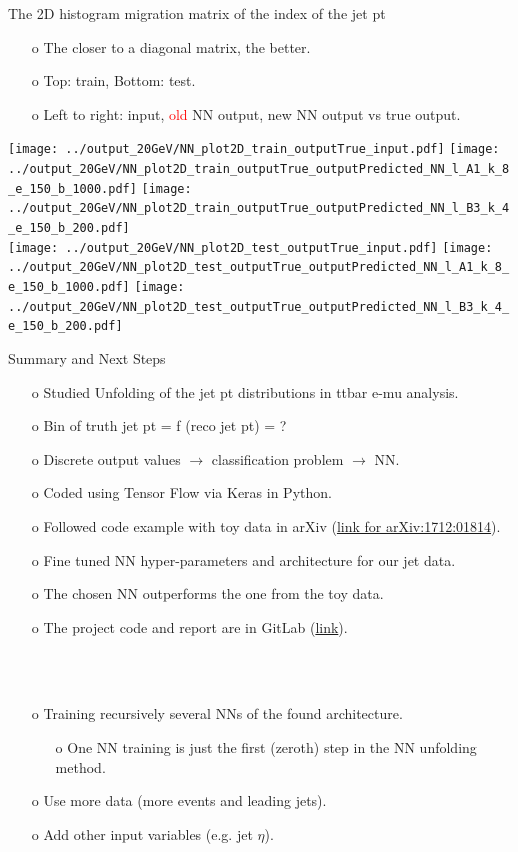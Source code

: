 \begin{frame}{The 2D histogram migration matrix of the index of the jet pt}
\begin{enumerate}
\item[o] The closer to a diagonal matrix, the better.
\item[o] Top: train, Bottom: test.
\item[o] Left to right: input, \textcolor{red}{old} NN output, \textcolor{OliveGreen}{new} NN output vs true output. 
\end{enumerate}
\centering
\texttt{[image: ../output\_20GeV/NN\_plot2D\_train\_outputTrue\_input.pdf]}
\texttt{[image: ../output\_20GeV/NN\_plot2D\_train\_outputTrue\_outputPredicted\_NN\_l\_A1\_k\_8\_e\_150\_b\_1000.pdf]}
\texttt{[image: ../output\_20GeV/NN\_plot2D\_train\_outputTrue\_outputPredicted\_NN\_l\_B3\_k\_4\_e\_150\_b\_200.pdf]}\\
\texttt{[image: ../output\_20GeV/NN\_plot2D\_test\_outputTrue\_input.pdf]}
\texttt{[image: ../output\_20GeV/NN\_plot2D\_test\_outputTrue\_outputPredicted\_NN\_l\_A1\_k\_8\_e\_150\_b\_1000.pdf]}
\texttt{[image: ../output\_20GeV/NN\_plot2D\_test\_outputTrue\_outputPredicted\_NN\_l\_B3\_k\_4\_e\_150\_b\_200.pdf]}\\
\end{frame}
\clearpage

\begin{frame}{Summary and Next Steps}
\begin{enumerate}
\item[o] Studied Unfolding of the jet pt distributions in ttbar e-mu analysis.
\item[o] Bin of truth jet pt = f (reco jet pt) = ?
\item[o] Discrete output values  $\rightarrow$ classification problem $\rightarrow$ NN.
\item[o] Coded using Tensor Flow via Keras in Python.
\item[o] Followed code example with toy data in arXiv (\href{https://arxiv.org/pdf/1712.01814.pdf}{link for arXiv:1712:01814}).
\item[o] Fine tuned NN hyper-parameters and architecture for our jet data.
\item[o] The chosen NN outperforms the one from the toy data.
\item[o] The project code and report are in GitLab (\href{https://gitlab.cern.ch/lciucu/MLUnfolding/}{link}).
\end{enumerate}
\ \\
\ \\
\begin{enumerate}
\item[o] Training recursively several NNs of the found architecture.
\begin{enumerate}
\item[o] One NN training is just the first (zeroth) step in the NN unfolding method.
\end{enumerate}
\item[o] Use more data (more events and leading jets).
\item[o] Add other input variables (e.g. jet $\eta$).
\end{enumerate}
\end{frame}
\clearpage


